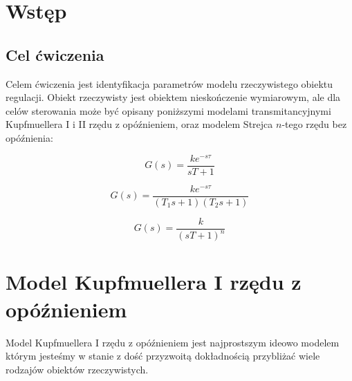 \documentclass[12pt]{article}
\begin{document}


\section{Wstęp}

\subsection{Cel ćwiczenia}

Celem ćwiczenia jest identyfikacja parametrów modelu rzeczywistego obiektu regulacji. Obiekt 
rzeczywisty jest obiektem nieskończenie wymiarowym, ale dla celów sterowania może być opisany 
poniższymi modelami transmitancyjnymi Kupfmuellera I i II rzędu z opóźnieniem,
oraz modelem Strejca $n$-tego rzędu bez opóźnienia:

\begin{equation}
	G(s)=\dfrac{ke^{-s\tau}}{sT+1}
	\label{equ:trankup1}
\end{equation}

\begin{equation}
	G(s)=\frac{ke^{-s\tau}}{(T_1s+1)(T_2s+1)}
	\label{equ:trankup2}
\end{equation}

\begin{equation}
	G(s)=\frac{k}{(sT+1)^n}
	\label{equ:transtrejc}
\end{equation}

\newpage

\section{Model Kupfmuellera I rzędu z opóźnieniem}

Model Kupfmuellera I rzędu z opóźnieniem jest najprostszym ideowo modelem którym jesteśmy
w stanie z dość przyzwoitą dokładnością przybliżać wiele rodzajów obiektów rzeczywistych.
\end{document}
